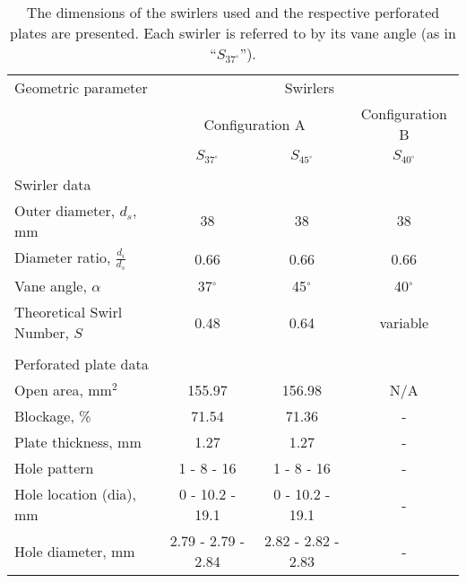 \begin{table}
  \caption[Swirler dimensions]{The dimensions of the swirlers used and the respective perforated plates are presented. Each swirler is referred to by its vane angle (as in ``\(S_{37^\circ}\)'').}
  \begin{center}
    \begin{tabular}{lccc}
      Geometric parameter & \multicolumn{3}{c}{Swirlers}\tabularnewline
      & \multicolumn{2}{c}{Configuration A} & Configuration B\tabularnewline
      & \(S_{37^\circ}\) & \(S_{45^\circ}\) & \(S_{40^\circ}\)\tabularnewline
      \hline \hline
      & & &\tabularnewline
      Swirler data & & & \tabularnewline
      \hline
      Outer diameter, \(d_s\), mm & 38 & 38 & 38\tabularnewline
      Diameter ratio, \(\frac{d_i}{d_s}\) & 0.66 & 0.66 & 0.66\tabularnewline
      Vane angle, \(\alpha\) & 37\(^\circ\) & 45\(^\circ\) & 40\(^\circ\)\tabularnewline
      Theoretical Swirl Number, \(S\) & 0.48 & 0.64 & variable\tabularnewline
      & & &\tabularnewline
      Perforated plate data & & & \tabularnewline
      \hline
      Open area, mm\(^2\) & 155.97 & 156.98 & N/A\tabularnewline
      Blockage, \% & 71.54 & 71.36 & -\tabularnewline
      Plate thickness, mm & 1.27 & 1.27 & - \tabularnewline
      Hole pattern & 1 - 8 - 16 & 1 - 8 - 16 & - \tabularnewline
      Hole location (dia), mm & 0 - 10.2 - 19.1 & 0 - 10.2 - 19.1 & -\tabularnewline
      Hole diameter, mm & 2.79 - 2.79 - 2.84 & 2.82 - 2.82 - 2.83 & -\tabularnewline
      \hline
    \end{tabular}
  \end{center}
  \label{tab:swirlerDimensions}
\end{table}

